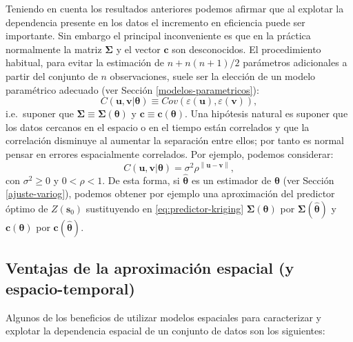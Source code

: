 \documentclass[
  spanish,
]{book}
\theoremstyle{break}
\theoremstyle{definition}
\theoremstyle{definition}
\theoremstyle{definition}
\theoremstyle{definition}
\theoremstyle{remark}
\begin{document}
Teniendo en cuenta los resultados anteriores podemos afirmar que al explotar la dependencia presente en los datos el incremento en eficiencia puede ser importante.
Sin embargo el principal inconveniente es que en la práctica normalmente la matriz \(\boldsymbol{\Sigma}\) y el vector \(\mathbf{c}\) son desconocidos.
El procedimiento habitual, para evitar la estimación de \(n+n(n+1)/2\) parámetros adicionales a partir del
conjunto de \(n\) observaciones, suele ser la elección de un modelo paramétrico adecuado (ver Sección \ref{modelos-parametricos}):
\[C(\mathbf{u},\mathbf{v}\left| \boldsymbol{\theta}\right. )\equiv Cov\left( \varepsilon (\mathbf{u}),\varepsilon (\mathbf{v})\right),\]
i.e.~suponer que \(\boldsymbol{\Sigma} \equiv \boldsymbol{\Sigma}\left( \boldsymbol{\theta}\right)\) y \(\mathbf{c}\equiv \mathbf{c}\left( \boldsymbol{\theta}\right)\).
Una hipótesis natural es suponer que los datos cercanos en el espacio o en el tiempo están correlados y que la correlación disminuye al aumentar la separación entre ellos; por tanto es normal pensar en errores espacialmente correlados.
Por ejemplo, podemos considerar:
\[C(\mathbf{u},\mathbf{v}\left| \boldsymbol{\theta}\right. )=\sigma^{2} \rho^{\left\| \mathbf{u}-\mathbf{v}\right\| },\]
con \(\sigma^{2} \geq 0\) y \(0<\rho <1\).
De esta forma, si \(\hat{\boldsymbol{\theta}}\) es un estimador de \(\boldsymbol{\theta}\) (ver Sección \ref{ajuste-variog}), podemos obtener por ejemplo una aproximación del predictor óptimo de \(Z(\mathbf{s}_{0} )\) sustituyendo en \eqref{eq:predictor-kriging} \(\boldsymbol{\Sigma}(\boldsymbol{\theta})\) por \(\boldsymbol{\Sigma}(\hat{\boldsymbol{\theta}} )\) y \(\mathbf{c}(\boldsymbol{\theta})\) por \(\mathbf{c}(\hat{\boldsymbol{\theta}} )\).

\hypertarget{ventajas-de-la-aproximaciuxf3n-espacial-y-espacio-temporal}{%
\subsection{Ventajas de la aproximación espacial (y espacio-temporal)}\label{ventajas-de-la-aproximaciuxf3n-espacial-y-espacio-temporal}}

Algunos de los beneficios de utilizar modelos espaciales para caracterizar y explotar la dependencia espacial de un conjunto de datos son los siguientes:
\end{document}
